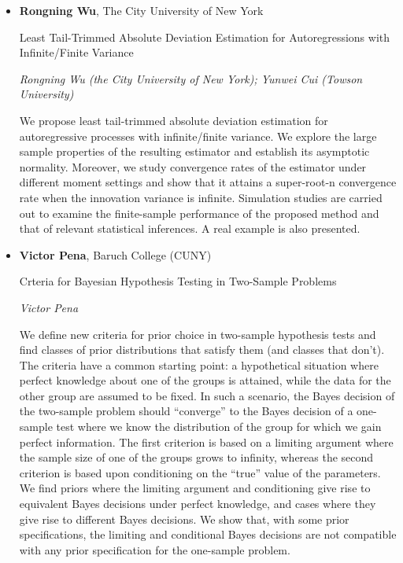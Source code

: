 \begin{itemize}
\item \textbf{Rongning Wu}, The City University of New York

Least Tail-Trimmed Absolute Deviation Estimation for Autoregressions with Infinite/Finite Variance

\emph{\footnotesize Rongning Wu (the City University of New York); Yunwei Cui (Towson University)}

We propose least tail-trimmed absolute deviation estimation for autoregressive processes with infinite/finite variance. We explore the large sample properties of the resulting estimator and establish its asymptotic normality. Moreover, we study convergence rates of the estimator under different moment settings and show that it attains a super-root-n convergence rate when the innovation variance is infinite. Simulation studies are carried out to examine the finite-sample performance of the proposed method and that of relevant statistical inferences. A real example is also presented.

\item \textbf{Victor Pena}, Baruch College (CUNY)

Crteria for Bayesian Hypothesis Testing in Two-Sample Problems

\emph{\footnotesize Victor Pena}

We define new criteria for prior choice in two-sample hypothesis tests and find classes of prior distributions that satisfy them (and classes that don't). The criteria have a common starting point: a hypothetical situation where perfect knowledge about one of the groups is attained, while the data for the other group are assumed to be fixed. In such a scenario, the Bayes decision of the two-sample problem should ``converge'' to the Bayes decision of a one-sample test where we know the distribution of the group for which we gain perfect information. The first criterion is based on a limiting argument where the sample size of one of the groups grows to infinity, whereas the second criterion is based upon conditioning on the ``true'' value of the parameters. We find priors where the limiting argument and conditioning give rise to equivalent Bayes decisions under perfect knowledge, and cases where they give rise to different Bayes decisions. We show that, with some prior specifications, the limiting and conditional Bayes decisions are not compatible with any prior specification for the one-sample problem.

\end{itemize}

